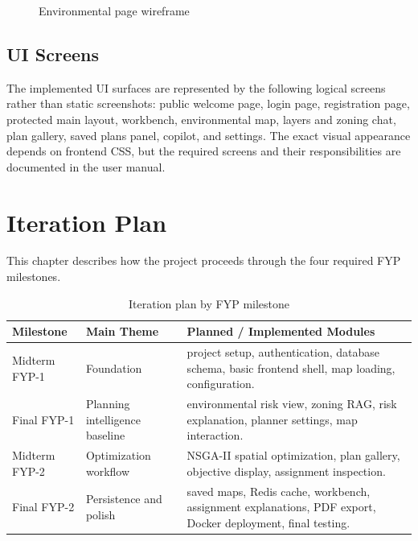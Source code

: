 \documentclass[12pt,a4paper,oneside]{report}
\begin{document}
\begin{figure}[H]\centering
{}
\caption{Environmental page wireframe}\end{figure}

\section{UI Screens}
The implemented UI surfaces are represented by the following logical screens rather than static screenshots: public welcome page, login page, registration page, protected main layout, workbench, environmental map, layers and zoning chat, plan gallery, saved plans panel, copilot, and settings. The exact visual appearance depends on frontend CSS, but the required screens and their responsibilities are documented in the user manual.

\chapter{Iteration Plan}
This chapter describes how the project proceeds through the four required FYP milestones.

\begin{longtable}{p{}p{}p{}}
\caption{Iteration plan by FYP milestone}\label{tab:iterationplan}\\
\toprule
Milestone & Main Theme & Planned / Implemented Modules \\
\midrule
Midterm FYP-1 & Foundation & project setup, authentication, database schema, basic frontend shell, map loading, configuration. \\
Final FYP-1 & Planning intelligence baseline & environmental risk view, zoning RAG, risk explanation, planner settings, map interaction. \\
Midterm FYP-2 & Optimization workflow & NSGA-II spatial optimization, plan gallery, objective display, assignment inspection. \\
Final FYP-2 & Persistence and polish & saved maps, Redis cache, workbench, assignment explanations, PDF export, Docker deployment, final testing. \\
\bottomrule
\end{longtable}
\end{document}
